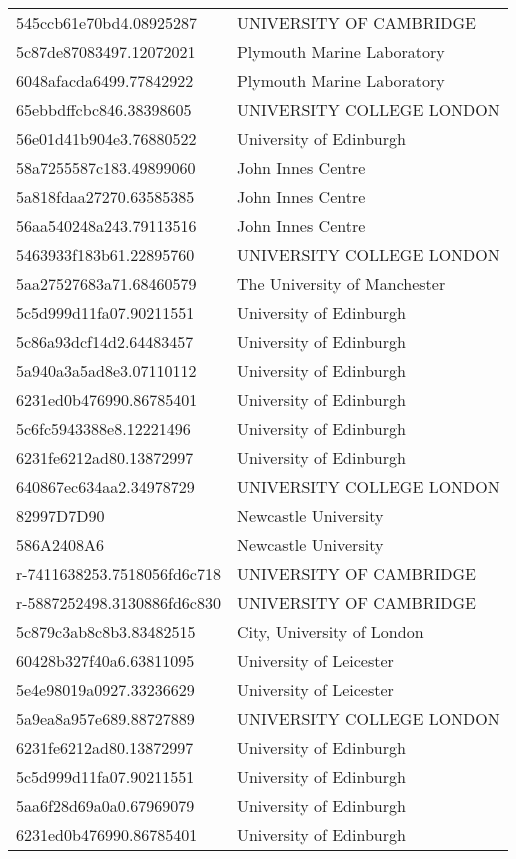 \begin{tabular}{ll}
545ccb61e70bd4.08925287 & UNIVERSITY OF CAMBRIDGE \\
5c87de87083497.12072021 & Plymouth Marine Laboratory \\
6048afacda6499.77842922 & Plymouth Marine Laboratory \\
65ebbdffcbc846.38398605 & UNIVERSITY COLLEGE LONDON \\
56e01d41b904e3.76880522 & University of Edinburgh \\
58a7255587c183.49899060 & John Innes Centre \\
5a818fdaa27270.63585385 & John Innes Centre \\
56aa540248a243.79113516 & John Innes Centre \\
5463933f183b61.22895760 & UNIVERSITY COLLEGE LONDON \\
5aa27527683a71.68460579 & The University of Manchester \\
5c5d999d11fa07.90211551 & University of Edinburgh \\
5c86a93dcf14d2.64483457 & University of Edinburgh \\
5a940a3a5ad8e3.07110112 & University of Edinburgh \\
6231ed0b476990.86785401 & University of Edinburgh \\
5c6fc5943388e8.12221496 & University of Edinburgh \\
6231fe6212ad80.13872997 & University of Edinburgh \\
640867ec634aa2.34978729 & UNIVERSITY COLLEGE LONDON \\
82997D7D90 & Newcastle University \\
586A2408A6 & Newcastle University \\
r-7411638253.7518056fd6c718 & UNIVERSITY OF CAMBRIDGE \\
r-5887252498.3130886fd6c830 & UNIVERSITY OF CAMBRIDGE \\
5c879c3ab8c8b3.83482515 & City, University of London \\
60428b327f40a6.63811095 & University of Leicester \\
5e4e98019a0927.33236629 & University of Leicester \\
5a9ea8a957e689.88727889 & UNIVERSITY COLLEGE LONDON \\
6231fe6212ad80.13872997 & University of Edinburgh \\
5c5d999d11fa07.90211551 & University of Edinburgh \\
5aa6f28d69a0a0.67969079 & University of Edinburgh \\
6231ed0b476990.86785401 & University of Edinburgh \\

\end{tabular}
